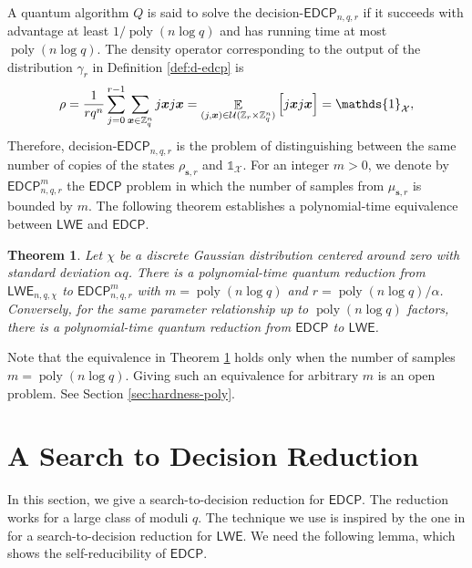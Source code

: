 \documentclass[11pt]{article}
\theoremstyle{plain}
\newtheorem{theorem}{Theorem}
\theoremstyle{definition}
\DeclareMathOperator{\poly}{poly}
\DeclareMathOperator{\E}{\mathbb{E}}
\let\ket\relax
\DeclarePairedDelimiter{\ket}{\lvert}{\rangle}
\let\bra\relax
\DeclarePairedDelimiter{\bra}{\langle}{\rvert}
\def\Z{\mathbb{Z}}
\def\lwe{\mathsf{LWE}}
\def\edcp{\mathsf{EDCP}}
\def\X{\mathcal{X}}
\def\U{\mathcal{U}}
\begin{document}
A quantum algorithm $Q$ is said to solve the decision-$\edcp_{n, q, r}$ if it succeeds with advantage at least $1 / \poly(n\log q)$ and has running time at most $\poly(n\log q)$. The density operator corresponding to the output of the distribution $\gamma_r$ in Definition \ref{def:d-edcp} is
\[ \rho = \frac{1}{rq^n} \sum_{j = 0}^{r - 1} \sum_{\bm{x} \in \Z_q^n}  \ket{j}\ket{\bm{x}} \bra{j}\bra{\bm{x}} = \E_{(j, \bm{x}) \in \U(\Z_r \times \Z_q^n)} \Big[ \ket{j}\ket{\bm{x}} \bra{j}\bra{\bm{x}} \Big] = \mathds{1}_{\X}, \]
Therefore, decision-$\edcp_{n, q, r}$ is the problem of distinguishing between the same number of copies of the states $\rho_{\bm{s}, r}$ and $\mathds{1}_{\X}$. For an integer $m > 0$, we denote by $\edcp_{n, q, r}^m$ the $\edcp$ problem in which the number of samples from $\mu_{\bm{s}, r}$ is bounded by $m$. The following theorem establishes a polynomial-time equivalence between $\lwe$ and $\edcp$.

\begin{theorem}
    \label{thm:lwe-edcp}
    Let $\chi$ be a discrete Gaussian distribution centered around zero with standard deviation $\alpha q$. There is a polynomial-time quantum reduction from $\lwe_{n, q, \chi}$ to $\edcp_{n, q, r}^m$ with $m = \poly(n\log q)$ and $r = \poly(n\log q) / \alpha$. Conversely, for the same parameter relationship up to $\poly(n\log q)$ factors, there is a polynomial-time quantum reduction from $\edcp$ to $\lwe$. 
\end{theorem}

Note that the equivalence in Theorem \ref{thm:lwe-edcp} holds only when the number of samples $m = \poly(n\log q)$. Giving such an equivalence for arbitrary $m$ is an open problem. See Section \ref{sec:hardness-poly}.





\section{A Search to Decision Reduction}

In this section, we give a search-to-decision reduction for $\edcp$. The reduction works for a large class of moduli $q$. The technique we use is inspired by the one in \cite{micciancio2012trapdoors} for a search-to-decision reduction for $\lwe$. We need the following lemma, which shows the self-reducibility of $\edcp$.
\end{document}
